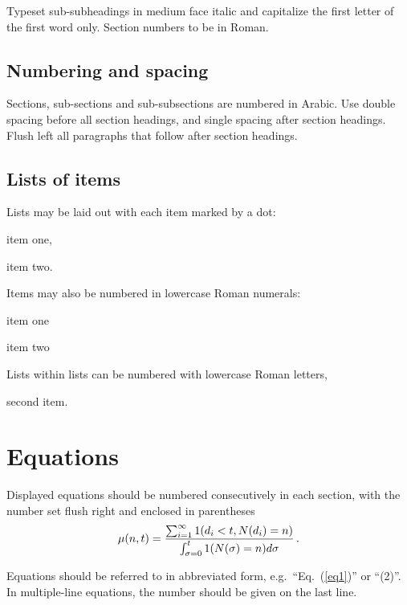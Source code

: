 \documentclass{ws-ijait}
\begin{document}
Typeset sub-subheadings in medium face italic and capitalize the
first letter of the first word only. Section numbers to be in
Roman.

\subsection{Numbering and spacing}

Sections, sub-sections and sub-subsections are numbered in
Arabic.  Use double spacing before all section headings, and
single spacing after section headings. Flush left all paragraphs
that follow after section headings.

\subsection{Lists of items}

Lists may be laid out with each item marked by a dot:
\begin{itemlist}
\item item one,
\item item two.
\end{itemlist}
Items may also be numbered in lowercase Roman numerals:
\begin{romanlist}[(ii)]
\item item one
\item item two
\begin{romanlist}[(b)]
\item Lists within lists can be numbered with lowercase Roman letters,
\item second item.
\end{romanlist}
\end{romanlist}

\section{Equations}

Displayed equations should be numbered consecutively in each
section, with the number set flush right and enclosed
in parentheses
\begin{equation}
\mu(n, t) = {\sum^\infty_{i=1} 1(d_i < t, N(d_i) = n) \over
\int^t_{\sigma=0} 1(N(\sigma) = n)d\sigma}\,. \label{eq1}
\end{equation}

Equations should be referred to in abbreviated form,
e.g.~``Eq.~(\ref{eq1})'' or ``(2)''. In multiple-line
equations, the number should be given on the last line.
\end{document}
